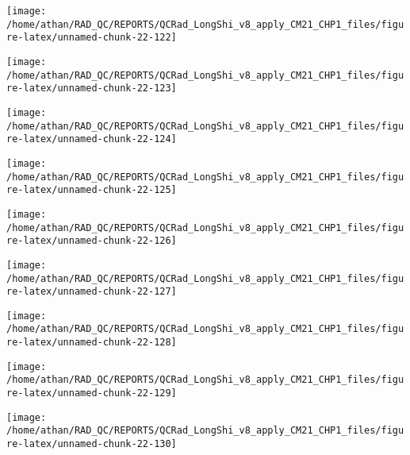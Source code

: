 \documentclass[
  10pt,
  a4paper,oneside]{article}
\begin{document}
\begin{center}\texttt{[image: /home/athan/RAD\_QC/REPORTS/QCRad\_LongShi\_v8\_apply\_CM21\_CHP1\_files/figure-latex/unnamed-chunk-22-122]} \end{center}

\begin{center}\texttt{[image: /home/athan/RAD\_QC/REPORTS/QCRad\_LongShi\_v8\_apply\_CM21\_CHP1\_files/figure-latex/unnamed-chunk-22-123]} \end{center}

\begin{center}\texttt{[image: /home/athan/RAD\_QC/REPORTS/QCRad\_LongShi\_v8\_apply\_CM21\_CHP1\_files/figure-latex/unnamed-chunk-22-124]} \end{center}

\begin{center}\texttt{[image: /home/athan/RAD\_QC/REPORTS/QCRad\_LongShi\_v8\_apply\_CM21\_CHP1\_files/figure-latex/unnamed-chunk-22-125]} \end{center}

\begin{center}\texttt{[image: /home/athan/RAD\_QC/REPORTS/QCRad\_LongShi\_v8\_apply\_CM21\_CHP1\_files/figure-latex/unnamed-chunk-22-126]} \end{center}

\begin{center}\texttt{[image: /home/athan/RAD\_QC/REPORTS/QCRad\_LongShi\_v8\_apply\_CM21\_CHP1\_files/figure-latex/unnamed-chunk-22-127]} \end{center}

\begin{center}\texttt{[image: /home/athan/RAD\_QC/REPORTS/QCRad\_LongShi\_v8\_apply\_CM21\_CHP1\_files/figure-latex/unnamed-chunk-22-128]} \end{center}

\begin{center}\texttt{[image: /home/athan/RAD\_QC/REPORTS/QCRad\_LongShi\_v8\_apply\_CM21\_CHP1\_files/figure-latex/unnamed-chunk-22-129]} \end{center}

\begin{center}\texttt{[image: /home/athan/RAD\_QC/REPORTS/QCRad\_LongShi\_v8\_apply\_CM21\_CHP1\_files/figure-latex/unnamed-chunk-22-130]} \end{center}
\end{document}
